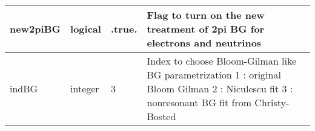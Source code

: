 \documentclass{article}
\begin{document}
\begin{longtable}{llll}
\midrule
new2piBG & \begin{minipage}[t]{2cm}logical\end{minipage} & \begin{minipage}[t]{2cm}.true.\end{minipage} & \begin{minipage}[t]{12cm}Flag to turn on the new treatment of 2pi BG for electrons and neutrinos\end{minipage}\\*
\midrule
indBG & \begin{minipage}[t]{2cm}integer\end{minipage} & \begin{minipage}[t]{2cm}3\end{minipage} & \begin{minipage}[t]{12cm}Index to choose Bloom-Gilman like BG parametrization 1 : original Bloom Gilman 2 : Niculescu fit 3 : nonresonant BG fit from Christy-Bosted\end{minipage}\\*
\bottomrule
\end{longtable}
{ }



\end{document}
